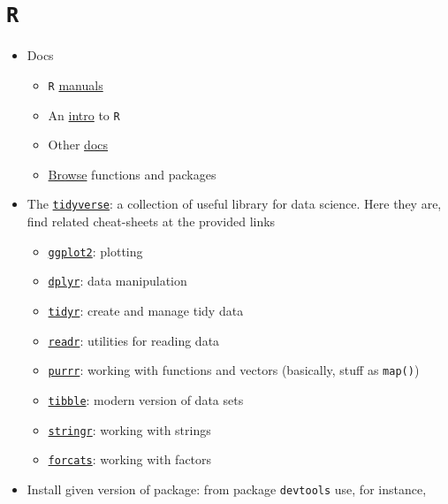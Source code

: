 \documentclass[a4paper,12pt,%
              final%
              ]{article}
\begin{document}
\section{\texttt{R}}
\begin{itemize}
  \item Docs
    \begin{itemize}
      \item \texttt{R} \href{https://cran.r-project.org/manuals.html}{manuals}
      \item An \href{https://cran.r-project.org/doc/manuals/r-release/R-intro.pdf}{intro} to \texttt{R}
      \item Other \href{https://www.r-project.org/other-docs.html}{docs}
      \item \href{https://www.rdocumentation.org/}{Browse} functions and packages
    \end{itemize}
  \item The \href{https://www.tidyverse.org/}{\texttt{tidyverse}}: a collection of useful library for data science. Here they are, find related cheat-sheets at the provided links
    \begin{itemize}
      \item \href{https://ggplot2.tidyverse.org/}{\texttt{ggplot2}}: plotting
      \item \href{https://dplyr.tidyverse.org/}{\texttt{dplyr}}: data manipulation
      \item \href{https://tidyr.tidyverse.org/}{\texttt{tidyr}}: create and manage tidy data
      \item \href{https://readr.tidyverse.org/}{\texttt{readr}}: utilities for reading data
      \item \href{https://purrr.tidyverse.org/}{\texttt{purrr}}: working with functions and vectors (basically, stuff as \verb|map()|)
      \item \href{https://tibble.tidyverse.org/}{\texttt{tibble}}: modern version of data sets
      \item \href{https://stringr.tidyverse.org/}{\texttt{stringr}}: working with strings
      \item \href{https://forcats.tidyverse.org/}{\texttt{forcats}}: working with factors
    \end{itemize}
  \item Install given version of package: from package \texttt{devtools} use, for instance,

\end{itemize}
\end{document}
